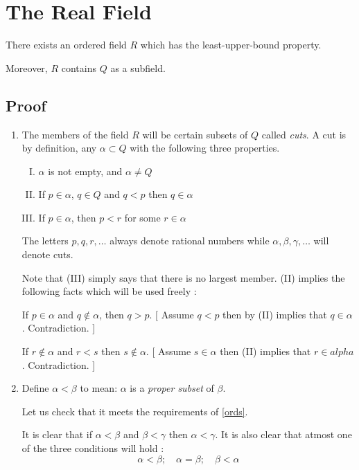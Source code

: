 \section{The Real Field}

\begin{thm}
    There exists an ordered field $R$ which has the least-upper-bound property.
    
    Moreover, $R$ contains $Q$ as a subfield.
\end{thm}

\subsection{Proof}
\begin{enumerate}[{\bf Step 1.}]
\item
The members of the field $R$ will be certain subsets of $Q$ called {\it cuts}.
A cut is by definition, any $\alpha \subset Q$ with the following three properties.

\begin{enumerate}[(I)]
    \item $\alpha$ is not empty, and $\alpha \neq Q$
    \item If $p \in \alpha$, $q \in Q$ and $q < p$ then $q \in \alpha$
    \item If $p \in \alpha$, then $p < r$ for some $r \in \alpha$
\end{enumerate}

The letters $p, q, r, \dots$ always denote rational numbers 
while $\alpha, \beta, \gamma, \dots$ will denote cuts.

Note that (III) simply says that there is no largest member.
(II) implies the following facts which will be used freely : 

If $p \in \alpha$ and $q \notin \alpha$, then $q > p$. 
[ Assume $q < p$ then by (II) implies that $q \in \alpha$. Contradiction. ]

If $r \notin \alpha$ and $r < s$ then $s \notin \alpha$.
[ Assume $s \in \alpha$ then (II) implies that $r \in alpha$. Contradiction. ]

\item 
Define $\alpha < \beta$ to mean: $\alpha$ is a {\it proper subset} of $\beta$.

Let us check that it meets the requirements of \ref{ords}.

It is clear that if $\alpha < \beta$ and $\beta < \gamma$ then $\alpha < \gamma$.
It is also clear that atmost one of the three conditions will hold : 
$$ \alpha < \beta; \quad \alpha = \beta; \quad \beta < \alpha $$


\end{enumerate}
